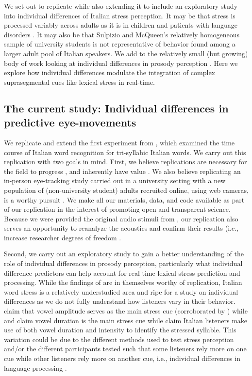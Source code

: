 We set out to replicate \cite{Sulpizio_McQueen_2012}  while also extending it to include an exploratory study into individual differences of Italian stress perception. It may be that stress is processed variably across adults as it is in children \citep[e.g.,][]{Colombo2014} and patients with language disorders \citep[e.g.,][]{Cappa1997}. It may also be that Sulpizio and McQueen's relatively homogeneous sample of university students is not representative of behavior found among a larger adult pool of Italian speakers. We add to the relatively small (but growing) body of work looking at individual differences in prosody perception \citep[e.g.,][]{Roy2017,Bishop2017,Lameris2023}. Here we explore how individual differences modulate the integration of complex suprasegmental cues like lexical stress in real-time.


\subsection{The current study: Individual differences in predictive eye-movements}

We replicate and extend the first experiment from \cite{Sulpizio_McQueen_2012}, which examined the time course of Italian word recognition for tri-syllabic Italian words. We carry out this replication with two goals in mind. First, we believe replications are necessary for the field to progress \citep{Rakosi2017}, and inherently have value \citep{Kobrock2023}. We also believe replicating an in-person eye-tracking study carried out in a university setting with a new population of (non-university student) adults recruited online, using web cameras, is a worthy pursuit \citep{Prystauka_Altmann_Rothman_2023}. We make all our materials, data, and code available as part of our replication in the interest of promoting open and transparent science. Because we were provided the original audio stimuli from \cite{Sulpizio_McQueen_2012}, our replication also serves an opportunity to reanalyze the acoustics and confirm their results (i.e., increase researcher degrees of freedom \cite{Corretta2023}.

Second, we carry out an exploratory study to gain a better understanding of the role of individual differences in prosody perception, particularly what individual difference predictors can help account for real-time lexical stress prediction and processing. While the findings of \cite{Sulpizio_McQueen_2012} are in themselves worthy of replication, Italian word stress is a relatively understudied area and ripe for a study on individual differences as we do not fully understand how listeners vary in their behavior.  \cite{Maturi1998} claim that vowel amplitude serves as the main stress cue (corroborated by \cite{Sulpizio_McQueen_2012}) while \cite{Alfano2006} and \cite{Alfano2009} claim vowel duration is the main stress cue while \cite{Tagliapietra2005} claim Italian listeners make use of both vowel duration and intensity to identify the stressed syllable. This variation could be due to the different methods used to test stress perception and/or the different participants tested such that some listeners rely more on one cue while other listeners rely more on another cue, i.e., individual differences in language processing \citep{Yu2019,Kidd2018}.

